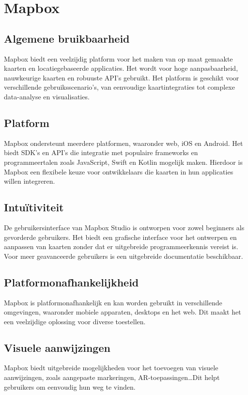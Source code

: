 \section{Mapbox}
\label{sec:mapbox}


\subsection*{Algemene bruikbaarheid}
Mapbox biedt een veelzijdig platform voor het maken van op maat gemaakte kaarten en locatiegebaseerde applicaties. Het wordt voor hoge aanpasbaarheid, nauwkeurige kaarten en robuuste API's gebruikt. Het platform is geschikt voor verschillende gebruiksscenario's, van eenvoudige kaartintegraties tot complexe data-analyse en visualisaties.

\subsection*{Platform}
Mapbox ondersteunt meerdere platformen, waaronder web, iOS en Android. Het biedt SDK's en API's die integratie met populaire frameworks en programmeertalen zoals JavaScript, Swift en Kotlin mogelijk maken. Hierdoor is Mapbox een flexibele keuze voor ontwikkelaars die kaarten in hun applicaties willen integreren.

\subsection*{Intuïtiviteit}
De gebruikersinterface van Mapbox Studio is ontworpen voor zowel beginners als gevorderde gebruikers. Het biedt een grafische interface voor het ontwerpen en aanpassen van kaarten zonder dat er uitgebreide programmeerkennis vereist is. Voor meer geavanceerde gebruikers is een uitgebreide documentatie beschikbaar.

\subsection*{Platformonafhankelijkheid}
Mapbox is platformonafhankelijk en kan worden gebruikt in verschillende omgevingen, waaronder mobiele apparaten, desktops en het web. Dit maakt het een veelzijdige oplossing voor diverse toestellen.

\subsection*{Visuele aanwijzingen}
Mapbox biedt uitgebreide mogelijkheden voor het toevoegen van visuele aanwijzingen, zoals aangepaste markeringen, AR-toepassingen\ldots Dit helpt gebruikers om eenvoudig hun weg te vinden.


